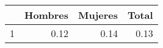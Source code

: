 \begin{table}[ht]
\centering
\begin{tabular}{rrrr}
  \hline
 & Hombres & Mujeres & Total \\ 
  \hline
1 & 0.12 & 0.14 & 0.13 \\ 
   \hline
\end{tabular}
\end{table}

